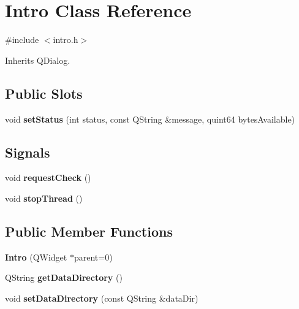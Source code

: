 \hypertarget{class_intro}{}\section{Intro Class Reference}
\label{class_intro}


{\ttfamily \#include $<$intro.\+h$>$}



Inherits Q\+Dialog.

\subsection*{Public Slots}
\begin{DoxyCompactItemize}
\item 
\mbox{\label{class_intro_a07d9b3b639deb51f1c7b1a9cedf09840}} 
void {\bfseries set\+Status} (int status, const Q\+String \&message, quint64 bytes\+Available)
\end{DoxyCompactItemize}
\subsection*{Signals}
\begin{DoxyCompactItemize}
\item 
\mbox{\label{class_intro_ac749e739adfe5830ffd7c62b72580adb}} 
void {\bfseries request\+Check} ()
\item 
\mbox{\label{class_intro_a062971eb5d928316b3d59b771d3b0397}} 
void {\bfseries stop\+Thread} ()
\end{DoxyCompactItemize}
\subsection*{Public Member Functions}
\begin{DoxyCompactItemize}
\item 
\mbox{\label{class_intro_a82415c2693757f51e4e93ccc8abd720e}} 
{\bfseries Intro} (Q\+Widget $\ast$parent=0)
\item 
\mbox{\label{class_intro_adb031cec261524a5ef561eb75f099f90}} 
Q\+String {\bfseries get\+Data\+Directory} ()
\item 
\mbox{\label{class_intro_a2f11c0fccc56ec7bb53cfddec98ee21b}} 
void {\bfseries set\+Data\+Directory} (const Q\+String \&data\+Dir)
\end{DoxyCompactItemize}
